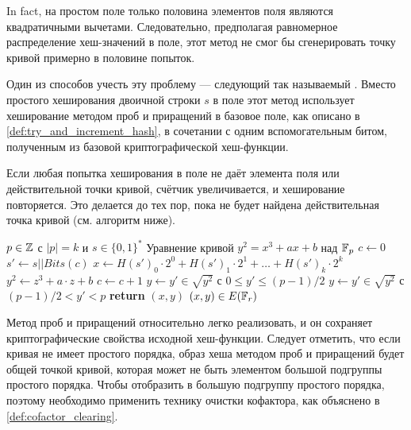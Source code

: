 In fact,
на простом поле только половина элементов поля являются квадратичными вычетами. Следовательно, предполагая равномерное распределение хеш-значений в поле, этот метод не смог бы сгенерировать точку кривой примерно в половине попыток. 

Один из способов учесть эту проблему — следующий так называемый . Вместо простого хеширования двоичной строки $s$ в поле этот метод использует хеширование методом проб и приращений в базовое поле, как описано в \ref{def:try_and_increment_hash}, в сочетании с одним вспомогательным битом, полученным из базовой криптографической хеш-функции.

Если любая попытка хеширования в поле не даёт элемента поля или действительной точки кривой, счётчик увеличивается, и хеширование повторяется. Это делается до тех пор, пока не будет найдена действительная точка кривой (см. алгоритм ниже).

\begin{algorithm}\label{alg:hash-to-e}\caption{Хеширование в $E(\F_p)$}
\begin{algorithmic}[0]
\Require $p \in \mathbb{Z}$ с $|p|=k$ и $s\in\{0,1\}^*$
\Require Уравнение кривой $y^2 = x^3 + ax +b$ над $\mathbb{F}_p$
\State $c \gets 0$	
\Repeat
\State $s' \gets s||Bits(c)$
\State $x \gets H(s')_0\cdot 2^0 + H(s')_1\cdot 2^1 + \ldots + H(s')_{k}\cdot 2^{k}$ 
\State $y^2 \gets z^3 + a\cdot z + b$ 
\State $c\gets c+1$
 
 
\State $y \gets y'\in \sqrt{y^2}$ с $0\leq y' \leq (p-1)/2$
\Else 
\State $y \gets y'\in \sqrt{y^2}$ с $(p-1)/2 < y' < p$
\EndIf
\State \textbf{return} $(x,y)$
\EndProcedure
\Ensure $(x,y)\in E(\mathbb{F}_r)$
\end{algorithmic}
\end{algorithm}

Метод проб и приращений относительно легко реализовать, и он сохраняет криптографические свойства исходной хеш-функции. Следует отметить, что если кривая не имеет простого порядка, образ хеша методом проб и приращений будет общей точкой кривой, которая может не быть элементом большой подгруппы простого порядка. Чтобы отобразить в большую подгруппу простого порядка, поэтому необходимо применить технику очистки кофактора, как объяснено в \ref{def:cofactor_clearing}.

